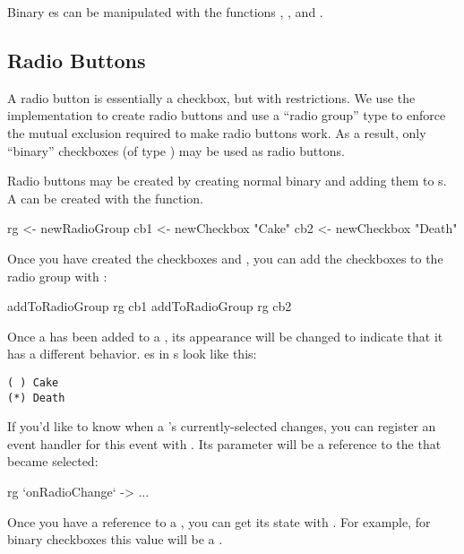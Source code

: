 Binary es can be manipulated with the functions
, , and
.

\subsection{Radio Buttons}
\label{sec:radio_buttons}

A radio button is essentially a checkbox, but with restrictions.  We
use the  implementation to create radio buttons and use a
``radio group'' type to enforce the mutual exclusion required to make
radio buttons work.  As a result, only ``binary'' checkboxes (of type
) may be used as radio buttons.

Radio buttons may be created by creating normal binary 
and adding them to s.  A  can be created
with the  function.

\begin{haskellcode}
 rg <- newRadioGroup
 cb1 <- newCheckbox "Cake"
 cb2 <- newCheckbox "Death"
\end{haskellcode}

Once you have created the checkboxes and , you can add
the checkboxes to the radio group with :

\begin{haskellcode}
 addToRadioGroup rg cb1
 addToRadioGroup rg cb2
\end{haskellcode}

Once a  has been added to a , its
appearance will be changed to indicate that it has a different
behavior.  es in s look like this:

\begin{verbatim}
( ) Cake
(*) Death
\end{verbatim}

If you'd like to know when a 's currently-selected
 changes, you can register an event handler for this
event with .  Its parameter will be a reference to
the  that became selected:

\begin{haskellcode}
 rg `onRadioChange` \theCb ->
   ...
\end{haskellcode}

Once you have a reference to a , you can get its state
with .  For example, for binary checkboxes this
value will be a .

